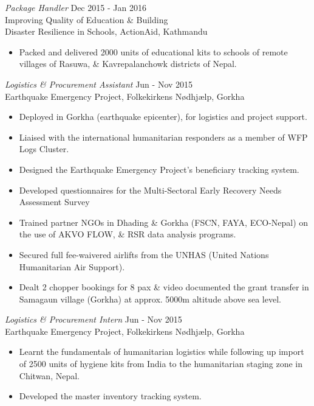 \documentclass[margin, 10pt]{res}
\begin{document}
\begin{resume}
\emph{Package Handler} \hfill Dec 2015 - Jan 2016\\
Improving Quality of Education \& Building\\Disaster Resilience in Schools, ActionAid, Kathmandu
\begin{itemize}
	\item Packed and delivered 2000 units of educational kits to schools of remote villages of Rasuwa, \& Kavrepalanchowk districts of Nepal.
\end{itemize}

\emph{Logistics \& Procurement Assistant} \hfill Jun - Nov 2015\\
Earthquake Emergency Project, Folkekirkens Nødhjælp, Gorkha
\begin{itemize}
	\item Deployed in Gorkha (earthquake epicenter), for logistics and project support.
	\item Liaised with the international humanitarian responders as a member of WFP Logs Cluster.
	\item Designed the Earthquake Emergency Project's beneficiary tracking system.
	\item Developed questionnaires for the Multi-Sectoral Early Recovery Needs Assessment Survey
	\item Trained partner NGOs in Dhading \& Gorkha (FSCN, FAYA, ECO-Nepal) on the use of AKVO FLOW, \& RSR data analysis programs.
	\item Secured full fee-waivered airlifts from the UNHAS (United Nations Humanitarian Air Support).
	\item Dealt 2 chopper bookings for 8 pax \& video documented the grant transfer in Samagaun village (Gorkha) at approx. 5000m altitude above sea level.
\end{itemize}

\emph{Logistics \& Procurement Intern} \hfill Jun - Nov 2015\\
Earthquake Emergency Project, Folkekirkens Nødhjælp, Gorkha
\begin{itemize}
	\item Learnt the fundamentals of humanitarian logistics while following up import of 2500 units of hygiene kits from India to the humanitarian staging zone in Chitwan, Nepal.
	\item Developed the master inventory tracking system.
\end{itemize}


\end{resume}
\end{document}
